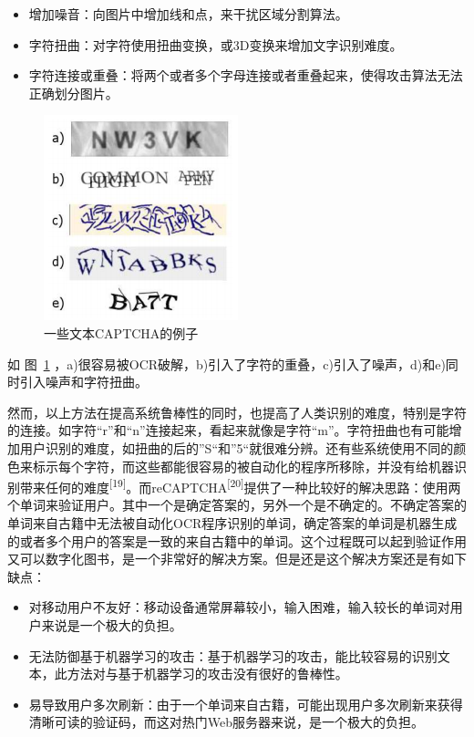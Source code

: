 \documentclass[bachelor,zhspacing]{cqu}  %
\def\tightlist{}
\begin{document}
\begin{itemize}
\tightlist
\item
  增加噪音：向图片中增加线和点，来干扰区域分割算法。
\item
  字符扭曲：对字符使用扭曲变换，或3D变换来增加文字识别难度。
\item
  字符连接或重叠：将两个或者多个字母连接或者重叠起来，使得攻击算法无法正确划分图片。
\end{itemize}

\begin{figure}[htbp]
\centering
\includegraphics{pic/text-captcha.png}
\caption{一些文本CAPTCHA的例子}\label{fig:text-captcha}
\end{figure}

如 图~\ref{fig:text-captcha}
，a)很容易被OCR破解，b)引入了字符的重叠，c)引入了噪声，d)和e)同时引入噪声和字符扭曲。

然而，以上方法在提高系统鲁棒性的同时，也提高了人类识别的难度，特别是字符的连接。如字符``r''和``n''连接起来，看起来就像是字符``m''。字符扭曲也有可能增加用户识别的难度，如扭曲的后的''S``和''5``就很难分辨。还有些系统使用不同的颜色来标示每个字符，而这些都能很容易的被自动化的程序所移除，并没有给机器识别带来任何的难度\textsuperscript{{[}19{]}}。而reCAPTCHA\textsuperscript{{[}20{]}}提供了一种比较好的解决思路：使用两个单词来验证用户。其中一个是确定答案的，另外一个是不确定的。不确定答案的单词来自古籍中无法被自动化OCR程序识别的单词，确定答案的单词是机器生成的或者多个用户的答案是一致的来自古籍中的单词。这个过程既可以起到验证作用又可以数字化图书，是一个非常好的解决方案。但是还是这个解决方案还是有如下缺点：

\begin{itemize}
\tightlist
\item
  对移动用户不友好：移动设备通常屏幕较小，输入困难，输入较长的单词对用户来说是一个极大的负担。
\item
  无法防御基于机器学习的攻击：基于机器学习的攻击，能比较容易的识别文本，此方法对与基于机器学习的攻击没有很好的鲁棒性。
\item
  易导致用户多次刷新：由于一个单词来自古籍，可能出现用户多次刷新来获得清晰可读的验证码，而这对热门Web服务器来说，是一个极大的负担。
\end{itemize}
\end{document}
